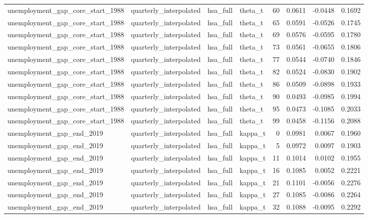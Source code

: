 \begin{tabular}{llllrrrr}
unemployment\_gap\_core\_start\_1988 & quarterly\_interpolated & hsa\_full & theta\_t & 60 & 0.0611 & -0.0448 & 0.1692 \\
unemployment\_gap\_core\_start\_1988 & quarterly\_interpolated & hsa\_full & theta\_t & 65 & 0.0591 & -0.0526 & 0.1745 \\
unemployment\_gap\_core\_start\_1988 & quarterly\_interpolated & hsa\_full & theta\_t & 69 & 0.0576 & -0.0595 & 0.1780 \\
unemployment\_gap\_core\_start\_1988 & quarterly\_interpolated & hsa\_full & theta\_t & 73 & 0.0561 & -0.0655 & 0.1806 \\
unemployment\_gap\_core\_start\_1988 & quarterly\_interpolated & hsa\_full & theta\_t & 77 & 0.0544 & -0.0740 & 0.1846 \\
unemployment\_gap\_core\_start\_1988 & quarterly\_interpolated & hsa\_full & theta\_t & 82 & 0.0524 & -0.0830 & 0.1902 \\
unemployment\_gap\_core\_start\_1988 & quarterly\_interpolated & hsa\_full & theta\_t & 86 & 0.0509 & -0.0898 & 0.1933 \\
unemployment\_gap\_core\_start\_1988 & quarterly\_interpolated & hsa\_full & theta\_t & 90 & 0.0493 & -0.0985 & 0.1994 \\
unemployment\_gap\_core\_start\_1988 & quarterly\_interpolated & hsa\_full & theta\_t & 95 & 0.0473 & -0.1085 & 0.2033 \\
unemployment\_gap\_core\_start\_1988 & quarterly\_interpolated & hsa\_full & theta\_t & 99 & 0.0458 & -0.1156 & 0.2088 \\
unemployment\_gap\_end\_2019 & quarterly\_interpolated & hsa\_full & kappa\_t & 0 & 0.0981 & 0.0067 & 0.1960 \\
unemployment\_gap\_end\_2019 & quarterly\_interpolated & hsa\_full & kappa\_t & 5 & 0.0972 & 0.0097 & 0.1903 \\
unemployment\_gap\_end\_2019 & quarterly\_interpolated & hsa\_full & kappa\_t & 11 & 0.1014 & 0.0102 & 0.1955 \\
unemployment\_gap\_end\_2019 & quarterly\_interpolated & hsa\_full & kappa\_t & 16 & 0.1085 & 0.0052 & 0.2221 \\
unemployment\_gap\_end\_2019 & quarterly\_interpolated & hsa\_full & kappa\_t & 21 & 0.1101 & -0.0056 & 0.2276 \\
unemployment\_gap\_end\_2019 & quarterly\_interpolated & hsa\_full & kappa\_t & 27 & 0.1085 & -0.0086 & 0.2264 \\
unemployment\_gap\_end\_2019 & quarterly\_interpolated & hsa\_full & kappa\_t & 32 & 0.1088 & -0.0095 & 0.2292 \\

\end{tabular}
